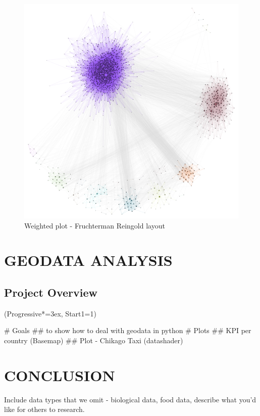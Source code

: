 \documentclass[12pt, a4paper]{article}
\let\OldEasylist\easylist
\let\OldEndEasylist\endeasylist
\renewenvironment{easylist}{%
    \OldEasylist%
    \ListProperties(Progressive*=3ex, Start1=1)%
}{%
    \OldEndEasylist%
}%
\begin{document}
\begin{figure}
    \centering
    \includegraphics[width=\textwidth]{src/youtube/hdg_weighted/hdg_pg_fg}
    \caption{Weighted plot - Fruchterman Reingold layout}
    \label{fig:hdg_pg_fg}
\end{figure}


\newpage
\section{GEODATA ANALYSIS}

\subsection{Project Overview}
\begin{easylist}
# Goals
## to show how to deal with geodata in python
# Plots
## KPI per country (Basemap)
 ## Plot - Chikago Taxi (datashader)
\end{easylist}


\newpage
\section{CONCLUSION}

Include data types that we omit - biological data, food data, describe what you'd like for others to research.

\newpage

\printbibliography
\end{document}
